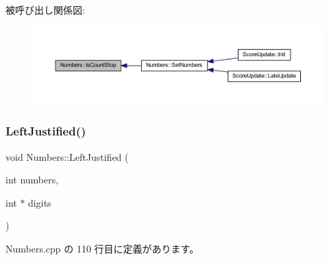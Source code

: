 被呼び出し関係図\+:\nopagebreak
\begin{figure}[H]
\begin{center}
\leavevmode
\includegraphics[width=350pt]{class_numbers_ab172b8637d38b710a4ff6dd3808522e0_icgraph}
\end{center}
\end{figure}
\mbox{\label{class_numbers_af4a06e0dd7dece56d60098837aae5aa5}} 
\subsubsection{\texorpdfstring{Left\+Justified()}{LeftJustified()}}
{\footnotesize\ttfamily void Numbers\+::\+Left\+Justified (\begin{DoxyParamCaption}\item[{int}]{numbers,  }\item[{int $\ast$}]{digits }\end{DoxyParamCaption})\hspace{0.3cm}{\ttfamily [private]}}



 Numbers.\+cpp の 110 行目に定義があります。

